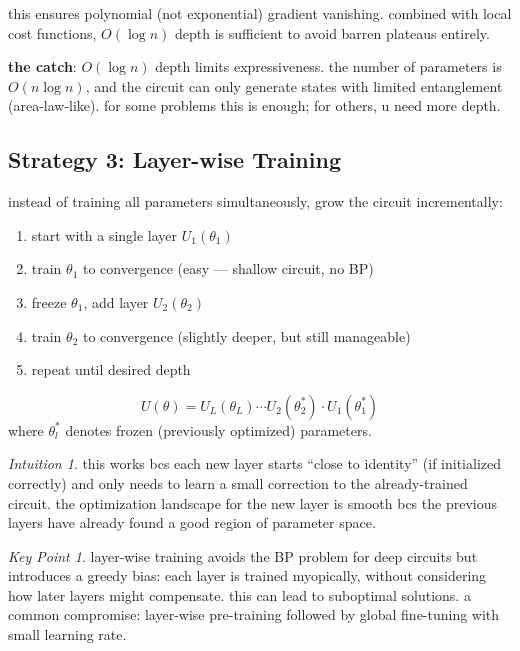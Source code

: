 \documentclass[11pt,a4paper]{article}
\theoremstyle{definition}
\theoremstyle{remark}
\newtheorem*{intuition}{Intuition}
\newtheorem*{keypoint}{Key Point}
\begin{document}
this ensures polynomial (not exponential) gradient vanishing. combined with local cost functions, $O(\log n)$ depth is sufficient to avoid barren plateaus entirely.

\textbf{the catch}: $O(\log n)$ depth limits expressiveness. the number of parameters is $O(n \log n)$, and the circuit can only generate states with limited entanglement (area-law-like). for some problems this is enough; for others, u need more depth.

\subsection{Strategy 3: Layer-wise Training}

instead of training all parameters simultaneously, grow the circuit incrementally:

\begin{enumerate}[label=\arabic*.]
    \item start with a single layer $U_1(\theta_1)$
    \item train $\theta_1$ to convergence (easy --- shallow circuit, no BP)
    \item freeze $\theta_1$, add layer $U_2(\theta_2)$
    \item train $\theta_2$ to convergence (slightly deeper, but still manageable)
    \item repeat until desired depth
\end{enumerate}

\begin{equation}
    U(\theta) = U_L(\theta_L) \cdots U_2(\theta_2^*) \cdot U_1(\theta_1^*)
\end{equation}
where $\theta_l^*$ denotes frozen (previously optimized) parameters.

\begin{intuition}
this works bcs each new layer starts ``close to identity'' (if initialized correctly) and only needs to learn a small correction to the already-trained circuit. the optimization landscape for the new layer is smooth bcs the previous layers have already found a good region of parameter space.
\end{intuition}

\begin{keypoint}
layer-wise training avoids the BP problem for deep circuits but introduces a greedy bias: each layer is trained myopically, without considering how later layers might compensate. this can lead to suboptimal solutions. a common compromise: layer-wise pre-training followed by global fine-tuning with small learning rate.
\end{keypoint}
\end{document}
